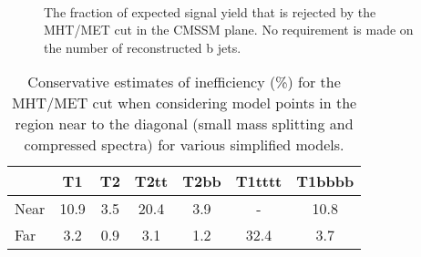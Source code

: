 \begin{figure}[h!]
  \begin{center}
     \\
    \caption{\label{fig:cmssm-mht-met}The fraction of expected signal
      yield that is rejected by the MHT/MET cut in the CMSSM plane. No
      requirement is made on the number of reconstructed b jets. }
  \end{center}
\end{figure}

\begin{table}[h!]
  \caption{Conservative estimates of inefficiency (\%) for
    the MHT/MET cut when considering model points in the
    region near to the diagonal (\ie small mass splitting and
    compressed spectra) for various simplified models.} 
  \label{tab:sms-mht-met-ineff}
  \centering
  \footnotesize
  \begin{tabular}{ lcccccc }
    \hline
         & T1   & T2  & T2tt & T2bb & T1tttt & T1bbbb \\ [0.5ex]
    \hline  
    Near & 10.9 & 3.5 & 20.4 & 3.9  & -      & 10.8   \\
    Far  & 3.2  & 0.9 & 3.1  & 1.2  & 32.4   & 3.7    \\
    \hline
  \end{tabular}
\end{table}

